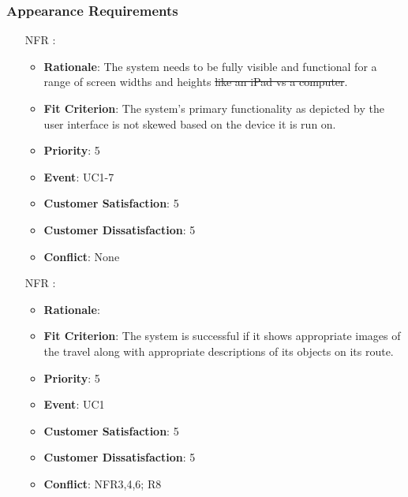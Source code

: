 \documentclass[12pt, titlepage]{article}
\newcounter{reqnum} %
\newcounter{freqnum} %
\begin{document}
\subsubsection{Appearance Requirements}
\begin{itemize}
\item[NFR\refstepcounter{freqnum}\thefreqnum
\label{NFR}:] 
\begin{itemize}
    \item \textbf{Rationale}: The system needs to be fully visible and functional for a range of screen widths and heights\sout{ like an iPad vs a computer}.
    \item \textbf{Fit Criterion}: The system's primary functionality as depicted by the user interface is not skewed based on the device it is run on.
    \item \textbf{Priority}: 5
    \item \textbf{Event}: UC1-7 %
    \item \textbf{Customer Satisfaction}: 5
    \item \textbf{Customer Dissatisfaction}: 5
    \item \textbf{Conflict}: None
\end{itemize}
\item[NFR\refstepcounter{freqnum}\thefreqnum
\label{NFR}:] 
\begin{itemize}
    \item \textbf{Rationale}:
    \item \textbf{Fit Criterion}: The system is successful if it shows appropriate images of the travel along with appropriate descriptions of its objects on its route.
    \item \textbf{Priority}: 5
    \item \textbf{Event}: UC1 %
    \item \textbf{Customer Satisfaction}: 5
    \item \textbf{Customer Dissatisfaction}: 5
    \item \textbf{Conflict}: NFR3,4,6; R8
\end{itemize}


\end{itemize}
\end{document}
